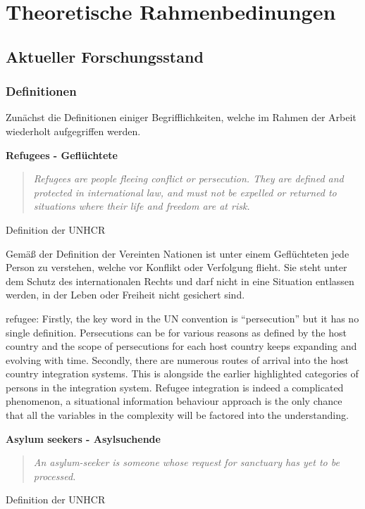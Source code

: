 \section{Theoretische Rahmenbedinungen}

\subsection{Aktueller Forschungsstand}

\subsubsection{Definitionen}

Zunächst die Definitionen einiger Begrifflichkeiten, welche im Rahmen der Arbeit wiederholt aufgegriffen werden.\newline

\textbf{Refugees - Geflüchtete}

\begin{quote}
    \textit{Refugees are people fleeing conflict or persecution. They are defined and protected in international law, and must not be expelled or returned to situations where their life and freedom are at risk.}\cite{unhcr2017refugees}
\end{quote}
\caption{Definition der UNHCR}

Gemäß der Definition der Vereinten Nationen ist unter einem Geflüchteten jede Person zu verstehen, welche vor Konflikt oder Verfolgung flieht. Sie steht unter dem Schutz des internationalen Rechts und darf nicht in eine Situation entlassen werden, in der Leben oder Freiheit nicht gesichert sind.\newline

refugee:
Firstly, the key word in the UN convention is “persecution”
but it has no single definition. Persecutions can be for
various reasons as defined by the host country and the
scope of persecutions for each host country keeps
expanding and evolving with time. Secondly, there are
numerous routes of arrival into the host country integration
systems. This is alongside the earlier highlighted categories
of persons in the integration system. Refugee integration is
indeed a complicated phenomenon, a situational
information behaviour approach is the only chance that all
the variables in the complexity will be factored into the
understanding.


\textbf{Asylum seekers - Asylsuchende}

\begin{quote}
    \textit{An asylum-seeker is someone whose request for sanctuary has yet to be processed.}\cite{unhcr2015asylum}
\end{quote}
\caption{Definition der UNHCR}

